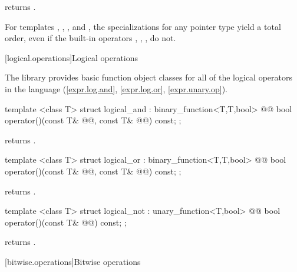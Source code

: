 \documentclass[american,twoside]{book}
\begin{document}
\begin{itemdescr}
\pnum
{} returns .
\end{itemdescr}

\pnum
For templates , , , and
, the specializations for any pointer type yield a total order,
even if the built-in operators \tcode{<}, \tcode{>}, \tcode{<=}, \tcode{>=}
do not.

[logical.operations]{Logical operations}

\pnum
The library provides basic function object classes for all of the logical
operators in the language (\ref{expr.log.and}, \ref{expr.log.or}, \ref{expr.unary.op}).

%
\begin{itemdecl}
template <class T> struct logical_and : binary_function<T,T,bool> {
  @@
    bool operator()(const T& @@, const T& @@) const;
};
\end{itemdecl}

\begin{itemdescr}
\pnum
{} returns .
\end{itemdescr}

%
\begin{itemdecl}
template <class T> struct logical_or : binary_function<T,T,bool> {
  @@
    bool operator()(const T& @@, const T& @@) const;
};
\end{itemdecl}

\begin{itemdescr}
\pnum
{} returns .
\end{itemdescr}

%
\begin{itemdecl}
template <class T> struct logical_not : unary_function<T,bool> {
  @@
    bool operator()(const T& @@) const;
};
\end{itemdecl}

\begin{itemdescr}
\pnum
{} returns .
\end{itemdescr}

[bitwise.operations]{Bitwise operations}
\end{document}
